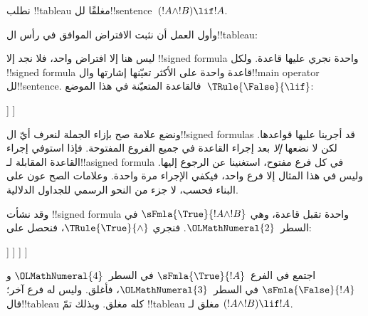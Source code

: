 \documentclass[../../../include/open-logic-section]{subfiles}
\begin{document}
      {}
      {}


\begin{ex}
نطلب !!{tableau} مغلقًا لل!!{sentence}~$(!A \land !B) \lif !A$.

وأول العمل أن نثبت الافتراض الموافق في رأس ال!!{tableau}:
\begin{oltableau}
  [\sFmla{\False}{(\formula{A} \land \formula{B}) \lif \formula{A}},
    just = \TAss]
\end{oltableau}

ليس هنا إلا افتراض واحد، فلا نجد إلا !!{signed formula} واحدة
نجري عليها قاعدة. ولكل !!{signed formula} قاعدة واحدة على الأكثر
تعيّنها إشارتها وال!!{main operator} لل!!{sentence}.
فالقاعدة المتعيّنة في هذا الموضع~$\TRule{\False}{\lif}$:
\begin{oltableau}
  [\sFmla{\False}{(\formula{A} \land \formula{B}) \lif \formula{A}},
    checked, just = \TAss
    [\sFmla{\True}{\formula{A} \land \formula{B}},
      just={\TRule{\False}{\lif}[1]}
      [\sFmla{\False}{\formula{A}}, just={\TRule{\False}{\lif}[1]}]
    ]
  ]
\end{oltableau}
ونضع علامة صح بإزاء الجملة لنعرف أيّ ال!!{signed formula}s قد
أجرينا عليها قواعدها. لكن لا نضعها \emph{إلا} بعد إجراء القاعدة
في جميع الفروع المفتوحة. فإذا استوفي إجراء القاعدة المقابلة
لـ!!a{signed formula} في كل فرع مفتوح، استغنينا عن الرجوع إليها.
وليس في هذا المثال إلا فرع واحد، فيكفي الإجراء مرة واحدة.
وعلامات الصح عون على البناء فحسب، لا جزء من النحو الرسمي للجداول
الدلالية.

وقد نشأت !!{signed formula} واحدة تقبل قاعدة، وهي
$\sFmla{\True}{!A \land !B}$ في السطر~$\OLMathNumeral{2}$. فنجري
$\TRule{\True}{\land}$، فنحصل على:
\begin{oltableau}
  [\sFmla{\False}{(\formula{A} \land \formula{B}) \lif \formula{A}},
    checked, just = \TAss
    [\sFmla{\True}{\formula{A} \land \formula{B}},
      just={\TRule{\False}{\lif}[1]}, checked
      [\sFmla{\False}{\formula{A}}, just={\TRule{\False}{\lif}[1]}
        [\sFmla{\True}{\formula{A}}, just={\TRule{\True}{\land}[2]}
          [\sFmla{\True}{\formula{B}}, just={\TRule{\True}{\land}[2]}, close
          ]
        ]
      ]
    ]
  ]
\end{oltableau}
اجتمع في الفرع~$\sFmla{\True}{!A}$ في السطر~$\OLMathNumeral{4}$
و$\sFmla{\False}{!A}$ في السطر~$\OLMathNumeral{3}$، فأغلق. وليس له فرع آخر؛
فال!!{tableau} كله مغلق. وبذلك تمّ !!{tableau} مغلق لـ
$(!A \land !B) \lif !A$.
\end{ex}
\end{document}
